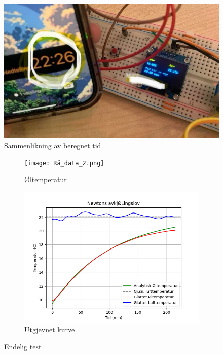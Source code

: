 \documentclass{article}
\begin{document}
\newline
\begin{figure}[h!]
    \centering
    \includegraphics[width=0.7\linewidth]{tid_sammenlikning.jpg}
    \caption{Sammenlikning av beregnet tid}
    \label{fig:tid_sammenlikn}
\end{figure}
\newpage
\begin{figure}[h!]
    \centering
    \begin{subfigure}[b]{0.45\textwidth}
       \centering
        \texttt{[image: Rå\_data\_2.png]}
        \caption{Øltemperatur}
        \label{fig:dahls_test}
    \end{subfigure}
    \hfill
    \begin{subfigure}[b]{0.45\textwidth}
        \centering
        \includegraphics[width=\textwidth]{Glattet_data_2.png}
        \caption{Utgjevnet kurve}
        \label{fig:glattet_dahls}
    \end{subfigure}
    \caption{Endelig test}
\end{figure}
\vfill
\end{document}
